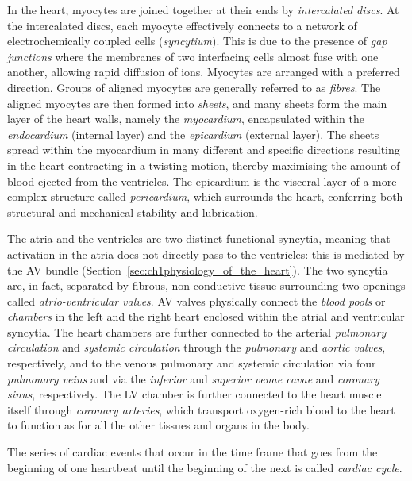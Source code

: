 \vspace{0.2cm}
In the heart, myocytes are joined together at their ends by \textit{intercalated discs}. At the intercalated discs, each myocyte effectively connects to a network of electrochemically coupled cells (\textit{syncytium}). This is due to the presence of \textit{gap junctions} where the membranes of two interfacing cells almost fuse with one another, allowing rapid diffusion of ions. Myocytes are arranged with a preferred direction. Groups of aligned myocytes are generally referred to as \textit{fibres}. The aligned myocytes are then formed into \textit{sheets}, and many sheets form the main layer of the heart walls, namely the \textit{myocardium}, encapsulated within the \textit{endocardium} (internal layer) and the \textit{epicardium} (external layer). The sheets spread within the myocardium in many different and specific directions resulting in the heart contracting in a twisting motion, thereby maximising the amount of blood ejected from the ventricles. The epicardium is the visceral layer of a more complex structure called \textit{pericardium}, which surrounds the heart, conferring both structural and mechanical stability and lubrication.

\vspace{0.2cm}
The atria and the ventricles are two distinct functional syncytia, meaning that activation in the atria does not directly pass to the ventricles: this is mediated by the AV bundle (Section~\ref{sec:ch1physiology_of_the_heart}). The two syncytia are, in fact, separated by fibrous, non-conductive tissue surrounding two openings called \textit{atrio-ventricular valves}. AV valves physically connect the \textit{blood pools} or \textit{chambers} in the left and the right heart enclosed within the atrial and ventricular syncytia. The heart chambers are further connected to the arterial \textit{pulmonary circulation} and \textit{systemic circulation} through the \textit{pulmonary} and \textit{aortic valves}, respectively, and to the venous pulmonary and systemic circulation via four \textit{pulmonary veins} and via the \textit{inferior} and \textit{superior venae cavae} and \textit{coronary sinus}, respectively. The LV chamber is further connected to the heart muscle itself through \textit{coronary arteries}, which transport oxygen-rich blood to the heart to function as for all the other tissues and organs in the body. 

\vspace{0.2cm}
The series of cardiac events that occur in the time frame that goes from the beginning of one heartbeat until the beginning of the next is called \textit{cardiac cycle}.


